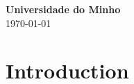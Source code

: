 \documentclass[12pt]{article}
\begin{document}
\begin{titlepage}
{ \large \bfseries 
Universidade do Minho}\\[0.5cm] 

{\large \today}\\[3cm] %
\vfill %

\end{titlepage}



\renewcommand{\listfigurename}{Contents}
\tableofcontents
\newpage



\newpage
{}
\section{Introduction}


\end{document}
